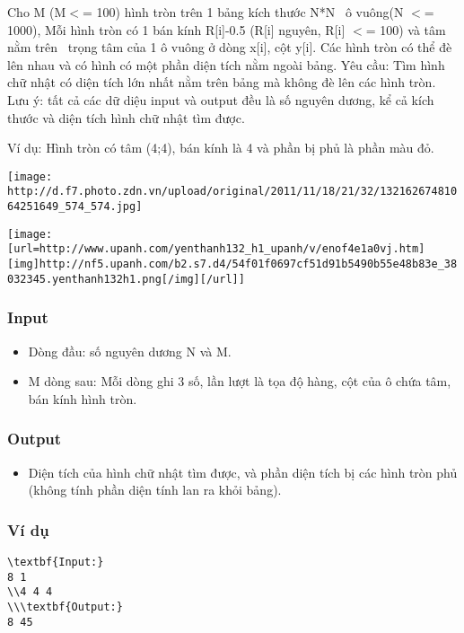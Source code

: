 



   Cho M (M$<$= 100) hình tròn trên 1 bảng kích thước N*N  ô vuông(N $<$= 1000), Mỗi hình tròn có 1 bán kính R[i]-0.5 (R[i] nguyên, R[i] $<$= 100) và tâm nằm trên  trọng tâm của 1 ô vuông ở dòng x[i], cột y[i]. Các hình tròn có thể đè lên nhau và có hình có một phần diện tích nằm ngoài bảng. Yêu cầu: Tìm hình chữ nhật có diện tích lớn nhất nằm trên bảng mà không đè lên các hình tròn. Lưu ý: tất cả các dữ diệu input và output đều là số nguyên dương, kể cả kích thước và diện tích hình chữ nhật tìm được.  

   Ví dụ: Hình tròn có tâm (4;4), bán kính là 4 và phần bị phủ là phần màu đỏ.  


\texttt{[image: http://d.f7.photo.zdn.vn/upload/original/2011/11/18/21/32/13216267481064251649\_574\_574.jpg]}


\texttt{[image: [url=http://www.upanh.com/yenthanh132\_h1\_upanh/v/enof4e1a0vj.htm][img]http://nf5.upanh.com/b2.s7.d4/54f01f0697cf51d91b5490b55e48b83e\_38032345.yenthanh132h1.png[/img][/url]]}



\subsubsection{   Input  }
\begin{itemize}
	\item     Dòng đầu: số nguyên dương N và M.   
\end{itemize}
\begin{itemize}
	\item     M dòng sau: Mỗi dòng ghi 3 số, lần lượt là tọa độ hàng, cột của ô chứa tâm, bán kính hình tròn.   
\end{itemize}

\subsubsection{   Output  }
\begin{itemize}
	\item 

       Diện tích của hình chữ nhật tìm được, và phần diện tích bị các hình tròn phủ (không tính phần diện tính lan ra khỏi bảng).      
\\
\end{itemize}

\subsubsection{   Ví dụ  }
\begin{verbatim}
\textbf{Input:}
8 1
\\4 4 4
\\\textbf{Output:}
8 45\end{verbatim}